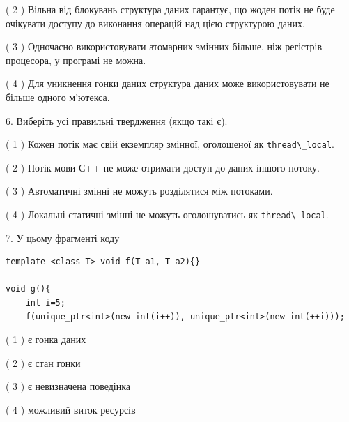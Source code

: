 \documentclass[12pt, ukrainian]{article}
\def\code#1{\Verb!#1!}
\begin{document}
\begin {large}
{( 2 ) Вільна від блокувань структура даних гарантує, що жоден потік не буде очікувати доступу до виконання операцій над цією структурою даних.%

( 3 ) Одночасно використовувати атомарних змінних більше, ніж регістрів процесора, у програмі не можна.%

( 4 ) Для уникнення гонки даних структура даних може використовувати не більше одного м’ютекса.%
\newpage



\vspace{5mm}
6. Виберіть усі правильні твердження (якщо такі є).\par
\vspace{2mm}

( 1 ) Кожен потік має свій екземпляр змінної, оголошеної як \code{thread\_local}.%

( 2 ) Потік мови С++ не може отримати доступ до даних іншого потоку.%

( 3 ) Автоматичні змінні не можуть розділятися між потоками.%

( 4 ) Локальні статичні змінні не можуть оголошуватись як \code{thread\_local}.%


\vspace{5mm}
7. У цьому фрагменті коду
\begin{verbatim}
template <class T> void f(T a1, T a2){}

void g(){
    int i=5;
    f(unique_ptr<int>(new int(i++)), unique_ptr<int>(new int(++i)));
\end{verbatim}

( 1 ) є гонка даних%

( 2 ) є стан гонки%

( 3 ) є невизначена поведінка%

( 4 ) можливий виток ресурсів%
}
\end {large}
\end{document}
